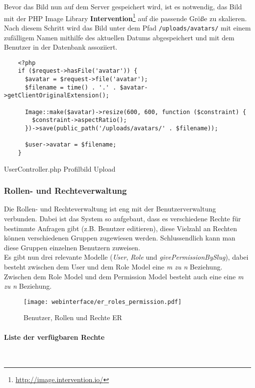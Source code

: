 Bevor das Bild nun auf dem Server gespeichert wird, ist es notwendig, das Bild
mit der 
PHP Image Library
\textbf{Intervention}\footnote{\url{http://image.intervention.io/}} auf
die passende Größe zu skalieren. Nach diesem Schritt wird das Bild unter dem
Pfad \verb|/uploads/avatars/| mit einem zufälligem Namen mithilfe des aktuellen Datums abgespeichert und mit
dem Benutzer in der Datenbank assoziiert.

\begin{listing}[H]
  \begin{verbatim}
    <?php
    if ($request->hasFile('avatar')) {
      $avatar = $request->file('avatar');
      $filename = time() . '.' . $avatar->getClientOriginalExtension();

      Image::make($avatar)->resize(600, 600, function ($constraint) {
        $constraint->aspectRatio();
      })->save(public_path('/uploads/avatars/' . $filename));

      $user->avatar = $filename;
    }
  \end{verbatim}
  \caption{UserController.php Profilbild Upload}
\end{listing}

\subsubsection{Rollen- und Rechteverwaltung}
Die Rollen- und Rechteverwaltung ist eng mit der Benutzerverwaltung verbunden.
Dabei ist das System so aufgebaut, dass es verschiedene Rechte für bestimmte
Anfragen gibt (z.B. Benutzer editieren), diese Vielzahl an Rechten können
verschiedenen Gruppen zugewiesen werden. Schlussendlich kann man diese Gruppen
einzelnen Benutzern zuweisen.\\

Es gibt nun drei relevante Modelle (\textit{User}, \textit{Role} und \textit{givePermissionBySlug}), dabei
besteht zwischen dem User und dem Role Model eine \textit{m zu n} Beziehung. Zwischen dem
Role Model und dem Permission Model besteht auch eine eine \textit{m zu n} Beziehung.

\begin{figure}[H]
  \centering
  \texttt{[image: webinterface/er\_roles\_permission.pdf]}
  \caption{Benutzer, Rollen und Rechte ER}
\end{figure}

\paragraph{Liste der verfügbaren Rechte}\mbox{}\\

